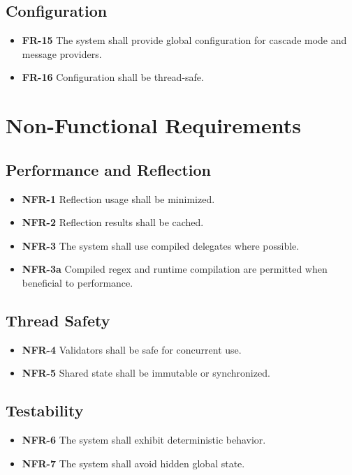 \documentclass[12pt,technote]{IEEEtran}
\begin{document}
\subsection{Configuration}
\begin{itemize}[noitemsep]
    \item \textbf{FR-15} The system shall provide global configuration for cascade mode and message providers.
    \item \textbf{FR-16} Configuration shall be thread-safe.
\end{itemize}

\section{Non-Functional Requirements}

\subsection{Performance and Reflection}
\begin{itemize}[noitemsep]
    \item \textbf{NFR-1} Reflection usage shall be minimized.
    \item \textbf{NFR-2} Reflection results shall be cached.
    \item \textbf{NFR-3} The system shall use compiled delegates where possible.
    \item \textbf{NFR-3a} Compiled regex and runtime compilation are permitted when beneficial to performance.
\end{itemize}

\subsection{Thread Safety}
\begin{itemize}[noitemsep]
    \item \textbf{NFR-4} Validators shall be safe for concurrent use.
    \item \textbf{NFR-5} Shared state shall be immutable or synchronized.
\end{itemize}

\subsection{Testability}
\begin{itemize}[noitemsep]
    \item \textbf{NFR-6} The system shall exhibit deterministic behavior.
    \item \textbf{NFR-7} The system shall avoid hidden global state.
\end{itemize}
\end{document}
